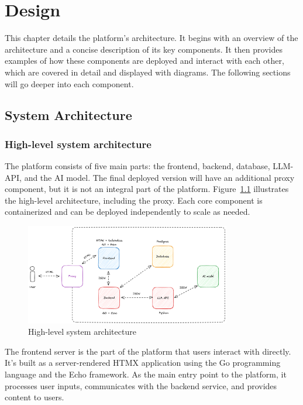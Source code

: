 \chapter{Design}\label{ch:design}

This chapter details the platform's architecture. It begins with an overview of the architecture and a concise description of its key components. It then provides examples of how these components are deployed and interact with each other, which are covered in detail and displayed with diagrams. The following sections will go deeper into each component.

\section{System Architecture}

\subsection{High-level system architecture}

The platform consists of five main parts: the frontend, backend, database, LLM-API, and the AI model. The final deployed version will have an additional proxy component, but it is not an integral part of the platform. Figure~\ref{fig:high-level-architecture} illustrates the high-level architecture, including the proxy. Each core component is containerized and can be deployed independently to scale as needed.

\begin{figure}[!h]
    \centering
    \includegraphics[width=0.8\textwidth, keepaspectratio]{figures/high-level-architecture.png}
    \caption{High-level system architecture}
    \label{fig:high-level-architecture}
\end{figure}

The frontend server is the part of the platform that users interact with directly. It's built as a server-rendered HTMX application using the Go programming language and the Echo framework. As the main entry point to the platform, it processes user inputs, communicates with the backend service, and provides content to users.

